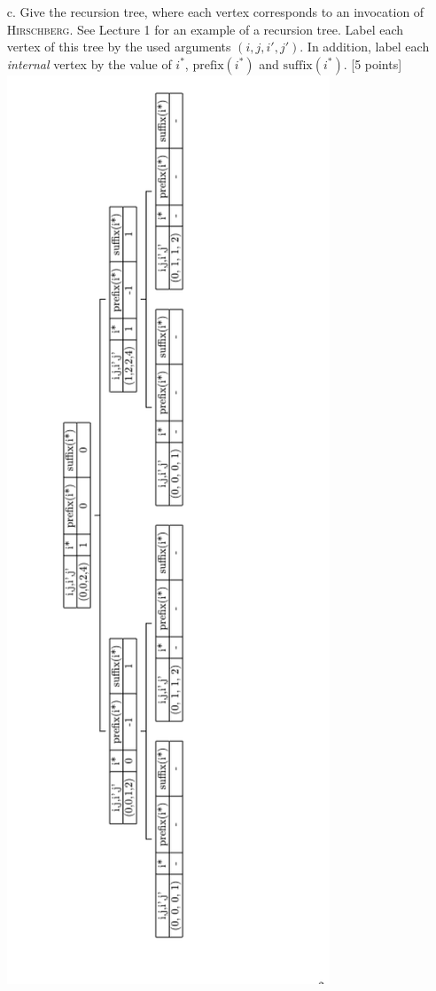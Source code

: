 \begin{enumerate}
\begin{enumerate}
\item[c.] Give the recursion tree, where each vertex corresponds to an invocation of \textsc{Hirschberg}.
See Lecture 1 for an example of a recursion tree. 
Label each vertex of this tree by the used arguments $(i,j,i',j')$. 
In addition, label each \emph{internal} vertex by the value of $i^*$, $\mathrm{prefix}(i^*)$ and $\mathrm{suffix}(i^*)$. [5 points]
\includegraphics[scale=0.8, angle =-90]{RecursionTree.png}









\end{enumerate}
\end{enumerate}

